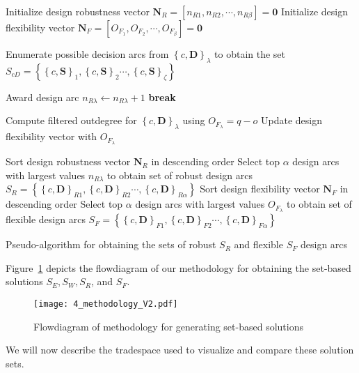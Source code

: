 \begin{algorithm*}
	\DontPrintSemicolon %
	Initialize design robustness vector $\mathbf{N}_R = \left[n_{R1},n_{R2},\cdots,n_{R\beta}\right] = \mathbf{0}$\;
	{\color{red} Initialize design flexibility vector $\mathbf{N}_F = \left[O_{F_{1}},O_{F_{2}},\cdots,O_{F_{\beta}}\right] = \mathbf{0}$}\;	
	 {
		Enumerate possible decision arcs from $\left\{c,\mathbf{D}\right\}_\lambda$ to obtain the set $S_{cD} = \left\{\left\{c,\mathbf{S}\right\}_{1},\left\{c,\mathbf{S}\right\}_{2}\cdots,\left\{c,\mathbf{S}\right\}_{\zeta}\right\}$\;
		 {
			 {
				
				 {
					Award design arc $n_{R\lambda} \gets n_{R\lambda} + 1$\;
					\textbf{break}
				}
			
			}
		}
		Compute filtered outdegree for $\left\{c,\mathbf{D}\right\}_\lambda$ using $O_{F_{\lambda}} = q - o$\;
		{\color{red} Update design flexibility vector with $O_{F_{\lambda}}$}\;
	}
	Sort design robustness vector $\mathbf{N}_R$ in descending order\;
	Select top $\alpha$ design arcs with largest values $n_{R\lambda}$ to obtain set of robust design arcs $S_R = \left\{\left\{c,\mathbf{D}\right\}_{R1},\left\{c,\mathbf{D}\right\}_{R2}\cdots,\left\{c,\mathbf{D}\right\}_{R\alpha}\right\}$\;
	Sort design flexibility vector $\mathbf{N}_F$ in descending order\;
	Select top $\alpha$ design arcs with largest values $O_{F_{\lambda}}$ to obtain set of flexible design arcs $S_F = \left\{\left\{c,\mathbf{D}\right\}_{F1},\left\{c,\mathbf{D}\right\}_{F2}\cdots,\left\{c,\mathbf{D}\right\}_{F\alpha}\right\}$\;
	\caption{Pseudo-algorithm for obtaining the sets of robust $S_{R}$ and flexible $S_{F}$ design arcs}
	\label{algo:SBDRobustalgo}
\end{algorithm*}

Figure~\ref{fig:methodology} depicts the flowdiagram of our methodology for obtaining the set-based solutions $S_E,S_W,S_R$, and $S_F$.
%
\begin{figure}[h!]
	\centering
	\texttt{[image: 4\_methodology\_V2.pdf]}
	\caption{Flowdiagram of methodology for generating set-based solutions}
	\label{fig:methodology}
\end{figure}
%
We will now describe the tradespace used to visualize and compare these solution sets.

